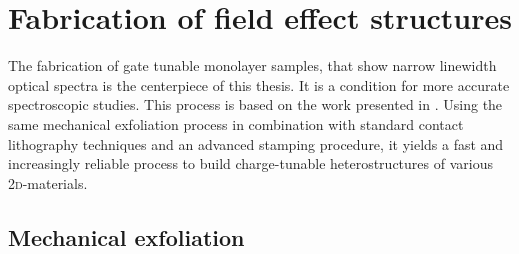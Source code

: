 \chapter{Fabrication of field effect structures}\label{exfoliation}

The fabrication of gate tunable \tmdg monolayer samples, that show narrow linewidth optical spectra is the centerpiece of this thesis. It is a condition for more accurate spectroscopic studies. This process is based on the work presented in  \cite{funk_spectroscopy_2017}. Using the same mechanical exfoliation process in combination with standard contact lithography techniques and an advanced stamping procedure, it yields a fast and increasingly reliable process to build charge-tunable heterostructures of various \textsc{2d}-materials. 

\section{Mechanical exfoliation}
